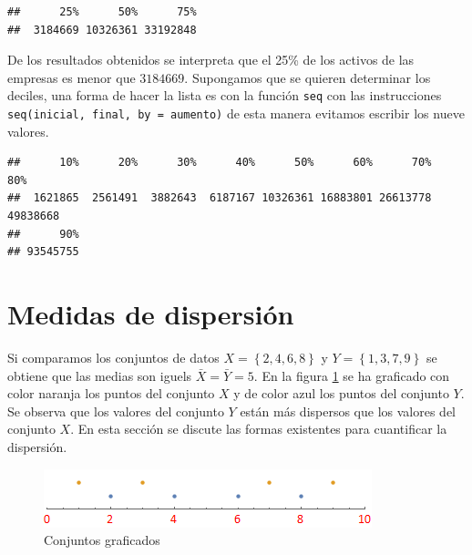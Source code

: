 \documentclass[]{book}
\newenvironment{Shaded}{\begin{snugshade}}{\end{snugshade}}
\newcommand{\KeywordTok}[1]{\textcolor[rgb]{0.13,0.29,0.53}{\textbf{#1}}}
\newcommand{\DataTypeTok}[1]{\textcolor[rgb]{0.13,0.29,0.53}{#1}}
\newcommand{\FloatTok}[1]{\textcolor[rgb]{0.00,0.00,0.81}{#1}}
\newcommand{\OperatorTok}[1]{\textcolor[rgb]{0.81,0.36,0.00}{\textbf{#1}}}
\newcommand{\NormalTok}[1]{#1}
\begin{document}
\begin{verbatim}
##      25%      50%      75% 
##  3184669 10326361 33192848
\end{verbatim}

De los resultados obtenidos se interpreta que el 25\% de los activos de
las empresas es menor que \(3 184 669\). Supongamos que se quieren
determinar los deciles, una forma de hacer la lista es con la función
\texttt{seq} con las instrucciones
\texttt{seq(inicial,\ final,\ by\ =\ aumento)} de esta manera evitamos
escribir los nueve valores.

\begin{Shaded}
\end{Shaded}

\begin{verbatim}
##      10%      20%      30%      40%      50%      60%      70%      80% 
##  1621865  2561491  3882643  6187167 10326361 16883801 26613778 49838668 
##      90% 
## 93545755
\end{verbatim}

\section{Medidas de dispersión}\label{medidas-de-dispersion}

Si comparamos los conjuntos de datos \(X=\left\{ 2,4,6,8 \right\}\) y
\(Y=\left\{1,3,7,9\right\}\) se obtiene que las medias son iguels
\(\bar{X}= \bar{Y}=5\). En la figura \ref{fig:rnl1} se ha graficado con
color naranja los puntos del conjunto \(X\) y de color azul los puntos
del conjunto \(Y\). Se observa que los valores del conjunto \(Y\) están
más dispersos que los valores del conjunto \(X\). En esta sección se
discute las formas existentes para cuantificar la dispersión.

\begin{figure}[h]

{\centering \includegraphics[width=0.5\linewidth]{rnl} 

}

\caption{Conjuntos graficados}\label{fig:rnl1}
\end{figure}
\end{document}
